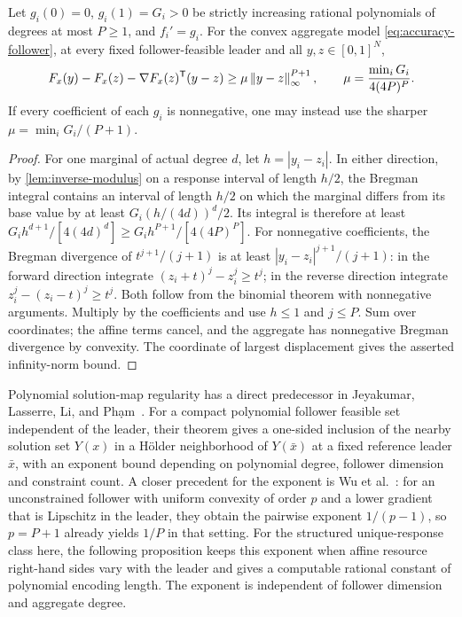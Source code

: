 \begin{lemma}
\label{lem:polynomial-bregman}
Let $g_i(0)=0$, $g_i(1)=G_i>0$ be strictly increasing rational
polynomials of degrees at most $P\ge1$, and $f_i'=g_i$. For the
convex aggregate model \eqref{eq:accuracy-follower}, at every fixed
follower-feasible leader and all $y,z\in[0,1]^N$,
\begin{equation}\label{eq:accuracy-bregman}
 F_x(y)-F_x(z)-\nabla F_x(z)^{\mathsf T}(y-z)
                 \ge\mu\left\lVert y-z\right\rVert_\infty^{P+1},\qquad
 \mu=\frac{\min_iG_i}{4(4P)^P}.
\end{equation}
If every coefficient of each $g_i$ is nonnegative, one may instead
use the sharper $\mu=\min_iG_i/(P+1)$.
\end{lemma}
\begin{proof}
For one marginal of actual degree $d$, let $h=|y_i-z_i|$.
In either direction, by \cref{lem:inverse-modulus} on a response
interval of length $h/2$, the Bregman integral contains an interval of
length $h/2$ on which the marginal differs from its base value by at least
$G_i(h/(4d))^d/2$. Its integral is therefore at least
$G_ih^{d+1}/[4(4d)^d]\ge G_ih^{P+1}/[4(4P)^P]$.
For nonnegative coefficients, the Bregman divergence of
$t^{j+1}/(j+1)$ is at least $|y_i-z_i|^{j+1}/(j+1)$: in the
forward direction integrate $(z_i+t)^j-z_i^j\ge t^j$; in the
reverse direction integrate $z_i^j-(z_i-t)^j\ge t^j$.
Both follow from the binomial theorem with nonnegative arguments.
Multiply by the coefficients and use $h\le1$ and $j\le P$.
Sum over coordinates; the affine terms cancel, and the aggregate has
nonnegative Bregman divergence by convexity. The coordinate of largest
displacement gives the asserted infinity-norm bound.
\end{proof}

Polynomial solution-map regularity has a direct predecessor in
Jeyakumar, Lasserre, Li, and Ph\d{a}m~\cite[Theorem 2.3]{JeyakumarEtAl2016}.
For a compact polynomial follower feasible set independent of the leader,
their theorem gives a one-sided inclusion of the nearby solution set
$Y(x)$ in a H\"older neighborhood of $Y(\bar x)$ at a fixed reference
leader $\bar x$, with an exponent bound depending on polynomial degree,
follower dimension and constraint count. A closer precedent for the exponent
is Wu et al.~\cite[Lemma 4.2 and Appendix B.1]{WuEtAl2026}: for an
unconstrained follower with uniform convexity of order $p$ and a lower
gradient that is Lipschitz in the leader, they obtain the pairwise exponent
$1/(p-1)$, so $p=P+1$ already yields $1/P$ in that setting. For the
structured unique-response class here, the following proposition keeps this
exponent when affine resource right-hand sides vary with the leader and gives
a computable rational constant of polynomial encoding length. The exponent
is independent of follower dimension and aggregate degree.

